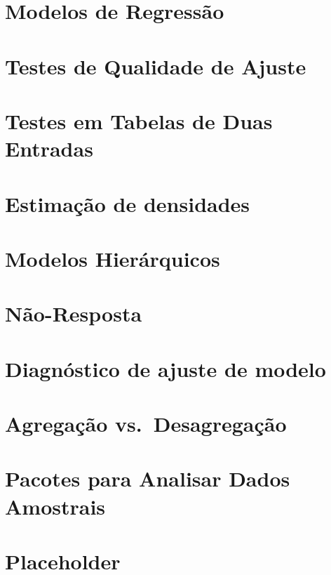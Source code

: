 \documentclass[]{book}
\begin{document}
\chapter{Modelos de Regressão}\label{modreg}

\chapter{Testes de Qualidade de Ajuste}\label{testqualajust}

\chapter{Testes em Tabelas de Duas Entradas}\label{testetab2}

\chapter{Estimação de densidades}\label{estimacao-de-densidades}

\chapter{Modelos Hierárquicos}\label{modelos-hierarquicos}

\chapter{Não-Resposta}\label{nao-resposta}

\chapter{Diagnóstico de ajuste de
modelo}\label{diagnostico-de-ajuste-de-modelo}

\chapter{Agregação vs.~Desagregação}\label{agregdesag}

\chapter{Pacotes para Analisar Dados
Amostrais}\label{pacotes-para-analisar-dados-amostrais}

\chapter{Placeholder}\label{placeholder}


\end{document}
